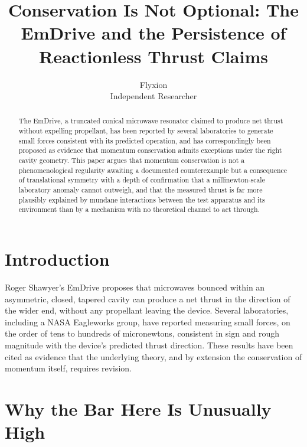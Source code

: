 \documentclass[11pt]{article}
\title{Conservation Is Not Optional: The EmDrive and the Persistence of Reactionless Thrust Claims}
\author{Flyxion \\ \small Independent Researcher}
\date{}
\begin{document}
\maketitle

\begin{abstract}
The EmDrive, a truncated conical microwave resonator claimed to produce net thrust without expelling propellant, has been reported by several laboratories to generate small forces consistent with its predicted operation, and has correspondingly been proposed as evidence that momentum conservation admits exceptions under the right cavity geometry. This paper argues that momentum conservation is not a phenomenological regularity awaiting a documented counterexample but a consequence of translational symmetry with a depth of confirmation that a millinewton-scale laboratory anomaly cannot outweigh, and that the measured thrust is far more plausibly explained by mundane interactions between the test apparatus and its environment than by a mechanism with no theoretical channel to act through.
\end{abstract}

\section{Introduction}

Roger Shawyer's EmDrive proposes that microwaves bounced within an asymmetric, closed, tapered cavity can produce a net thrust in the direction of the wider end, without any propellant leaving the device. Several laboratories, including a NASA Eagleworks group, have reported measuring small forces, on the order of tens to hundreds of micronewtons, consistent in sign and rough magnitude with the device's predicted thrust direction. These results have been cited as evidence that the underlying theory, and by extension the conservation of momentum itself, requires revision.

\section{Why the Bar Here Is Unusually High}
\end{document}
